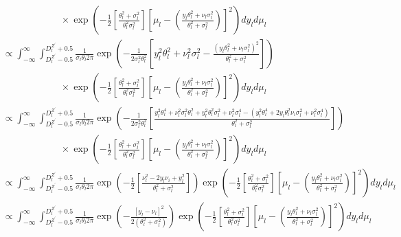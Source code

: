 \documentclass[a4paper]{article}
\begin{document}
\begin{align}
    & \qquad \qquad \qquad \times \exp\left(-\frac{1}{2}\left[\frac{\theta^2_l + \sigma^2_l}{\theta^2_l\sigma^2_l}\right]\left[\mu_l - \left(\frac{y_l\theta^2_l + \nu_l\sigma^2_l}{\theta^2_l + \sigma^2_l}\right)\right]^2\right) dy_l d\mu_l\nonumber\\
    &\propto \int_{-\infty}^\infty \int_{D^{Z^\prime}_l - 0.5}^{D^{Z^\prime}_l + 0.5} \frac{1}{\sigma_l\theta_l 2\pi} \exp\left(-\frac{1}{2\sigma^2_l\theta^2_l}\left[y^2_l\theta^2_l + \nu^2_l\sigma^2_l - \frac{\left(y_l\theta^2_l + \nu_l\sigma^2_l\right)^2}{\theta^2_l + \sigma^2_l}\right]\right)\nonumber\\
    & \qquad \qquad \qquad \times \exp\left(-\frac{1}{2}\left[\frac{\theta^2_l + \sigma^2_l}{\theta^2_l\sigma^2_l}\right]\left[\mu_l - \left(\frac{y_l\theta^2_l + \nu_l\sigma^2_l}{\theta^2_l + \sigma^2_l}\right)\right]^2\right) dy_l d\mu_l\nonumber\\
    &\propto \int_{-\infty}^\infty \int_{D^{Z^\prime}_l - 0.5}^{D^{Z^\prime}_l + 0.5} \frac{1}{\sigma_l\theta_l 2\pi} \exp\left(-\frac{1}{2\sigma^2_l\theta^2_l}\left[\frac{y^2_l\theta^4_l + \nu^2_l\sigma^2_l\theta^2_l + y^2_l\theta^2_l\sigma^2_l + \nu^2_l\sigma^4_l - \left(y^2_l\theta^4_l + 2y_l\theta^2_l\nu_i\sigma^2_l + \nu^2_l\sigma^4_l\right)}{\theta^2_l + \sigma^2_l}\right]\right)\nonumber\\
    & \qquad \qquad \qquad \times \exp\left(-\frac{1}{2}\left[\frac{\theta^2_l + \sigma^2_l}{\theta^2_l\sigma^2_l}\right]\left[\mu_l - \left(\frac{y_l\theta^2_l + \nu_l\sigma^2_l}{\theta^2_l + \sigma^2_l}\right)\right]^2\right) dy_l d\mu_l\nonumber\\
    &\propto \int_{-\infty}^\infty \int_{D^{Z^\prime}_l - 0.5}^{D^{Z^\prime}_l + 0.5} \frac{1}{\sigma_l\theta_l 2\pi} \exp\left(-\frac{1}{2}\left[\frac{\nu^2_l - 2y_l\nu_i + y^2_l}{\theta^2_l + \sigma^2_l}\right]\right)\exp\left(-\frac{1}{2}\left[\frac{\theta^2_l + \sigma^2_l}{\theta^2_l\sigma^2_l}\right]\left[\mu_l - \left(\frac{y_l\theta^2_l + \nu_l\sigma^2_l}{\theta^2_l + \sigma^2_l}\right)\right]^2\right) dy_l d\mu_l\nonumber\\
    &\propto \int_{-\infty}^\infty \int_{D^{Z^\prime}_l - 0.5}^{D^{Z^\prime}_l + 0.5} \frac{1}{\sigma_l\theta_l 2\pi} \exp\left(-\frac{\left[y_l - \nu_l\right]^2}{2\left(\theta^2_l + \sigma^2_l\right)}\right)\exp\left(-\frac{1}{2}\left[\frac{\theta^2_l + \sigma^2_l}{\theta^2_l\sigma^2_l}\right]\left[\mu_l - \left(\frac{y_l\theta^2_l + \nu_l\sigma^2_l}{\theta^2_l + \sigma^2_l}\right)\right]^2\right) dy_l d\mu_l\nonumber\\

\end{align}
\end{document}
